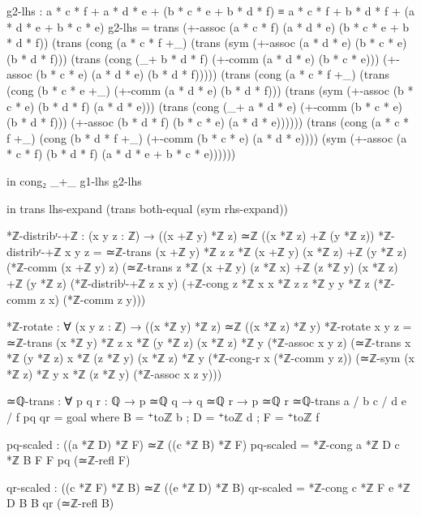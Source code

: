 \documentclass[11pt,a4paper]{book}
\begin{document}
\begin{code}
            g2-lhs : a * c * f + a * d * e + (b * c * e + b * d * f)
                   ≡ a * c * f + b * d * f + (a * d * e + b * c * e)
            g2-lhs = trans (+-assoc (a * c * f) (a * d * e) (b * c * e + b * d * f))
                     (trans (cong (a * c * f +_) (trans (sym (+-assoc (a * d * e) (b * c * e) (b * d * f)))
                            (trans (cong (_+ b * d * f) (+-comm (a * d * e) (b * c * e)))
                            (+-assoc (b * c * e) (a * d * e) (b * d * f)))))
                     (trans (cong (a * c * f +_) (trans (cong (b * c * e +_) (+-comm (a * d * e) (b * d * f)))
                            (trans (sym (+-assoc (b * c * e) (b * d * f) (a * d * e)))
                            (trans (cong (_+ a * d * e) (+-comm (b * c * e) (b * d * f)))
                            (+-assoc (b * d * f) (b * c * e) (a * d * e))))))
                     (trans (cong (a * c * f +_) (cong (b * d * f +_) (+-comm (b * c * e) (a * d * e))))
                     (sym (+-assoc (a * c * f) (b * d * f) (a * d * e + b * c * e))))))
                     
          in cong₂ _+_ g1-lhs g2-lhs
          
      in trans lhs-expand (trans both-equal (sym rhs-expand))

*ℤ-distribʳ-+ℤ : (x y z : ℤ) → ((x +ℤ y) *ℤ z) ≃ℤ ((x *ℤ z) +ℤ (y *ℤ z))
*ℤ-distribʳ-+ℤ x y z = 
  ≃ℤ-trans {(x +ℤ y) *ℤ z} {z *ℤ (x +ℤ y)} {(x *ℤ z) +ℤ (y *ℤ z)}
    (*ℤ-comm (x +ℤ y) z)
    (≃ℤ-trans {z *ℤ (x +ℤ y)} {(z *ℤ x) +ℤ (z *ℤ y)} {(x *ℤ z) +ℤ (y *ℤ z)}
      (*ℤ-distribˡ-+ℤ z x y)
      (+ℤ-cong {z *ℤ x} {x *ℤ z} {z *ℤ y} {y *ℤ z} (*ℤ-comm z x) (*ℤ-comm z y)))

*ℤ-rotate : ∀ (x y z : ℤ) → ((x *ℤ y) *ℤ z) ≃ℤ ((x *ℤ z) *ℤ y)
*ℤ-rotate x y z = 
  ≃ℤ-trans {(x *ℤ y) *ℤ z} {x *ℤ (y *ℤ z)} {(x *ℤ z) *ℤ y}
    (*ℤ-assoc x y z)
    (≃ℤ-trans {x *ℤ (y *ℤ z)} {x *ℤ (z *ℤ y)} {(x *ℤ z) *ℤ y}
      (*ℤ-cong-r x (*ℤ-comm y z))
      (≃ℤ-sym {(x *ℤ z) *ℤ y} {x *ℤ (z *ℤ y)} (*ℤ-assoc x z y)))

≃ℚ-trans : ∀ {p q r : ℚ} → p ≃ℚ q → q ≃ℚ r → p ≃ℚ r
≃ℚ-trans {a / b} {c / d} {e / f} pq qr = goal
  where
    B = ⁺toℤ b ; D = ⁺toℤ d ; F = ⁺toℤ f
    
    pq-scaled : ((a *ℤ D) *ℤ F) ≃ℤ ((c *ℤ B) *ℤ F)
    pq-scaled = *ℤ-cong {a *ℤ D} {c *ℤ B} {F} {F} pq (≃ℤ-refl F)
    
    qr-scaled : ((c *ℤ F) *ℤ B) ≃ℤ ((e *ℤ D) *ℤ B)
    qr-scaled = *ℤ-cong {c *ℤ F} {e *ℤ D} {B} {B} qr (≃ℤ-refl B)
    

\end{code}
\end{document}
